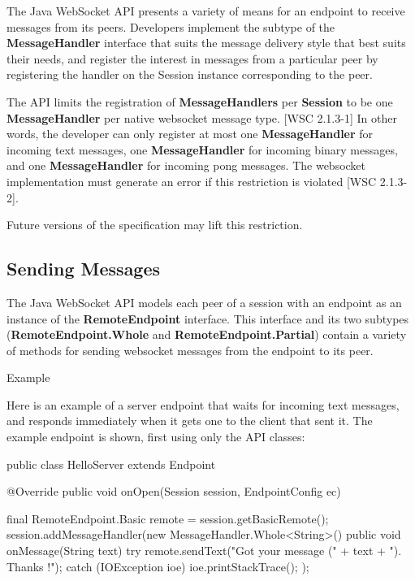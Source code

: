 The Java WebSocket API presents a variety of means for an endpoint to receive messages from its peers. Developers implement the subtype of the \textbf{MessageHandler} interface that suits the message delivery style that best suits their needs, and register the interest in messages from a particular peer by registering the handler on the Session instance corresponding to the peer.

The API limits the registration of \textbf{MessageHandlers} per \textbf{Session} to be one \textbf{MessageHandler} per native websocket message type. [WSC 2.1.3-1] In other words, the developer can only register at most one \textbf{MessageHandler} for incoming text messages, one \textbf{MessageHandler} for incoming binary messages, and one \textbf{MessageHandler} for incoming pong messages. The websocket implementation must generate an error if this restriction is violated [WSC 2.1.3-2].

Future versions of the specification may lift this restriction.

\subsection{Sending Messages}

The Java WebSocket API models each peer of a session with an endpoint as an instance of the \textbf{RemoteEndpoint} interface. This interface and its two subtypes (\textbf{RemoteEndpoint.Whole} and \textbf{RemoteEndpoint.Partial}) contain a variety of methods for sending websocket messages from the endpoint to its peer.

Example

Here is an example of a server endpoint that waits for incoming text messages, and responds immediately when it gets one to the client that sent it. The example endpoint is shown, first using only the API classes:

\begin{listing}{1}
public class HelloServer extends Endpoint {
    @Override
    public void onOpen(Session session, EndpointConfig ec) {
        final RemoteEndpoint.Basic remote = session.getBasicRemote();
        session.addMessageHandler(new MessageHandler.Whole<String>() {
            public void onMessage(String text) {
                try {
                    remote.sendText("Got your message (" + text + "). Thanks !");
                } catch (IOException ioe) {
                    ioe.printStackTrace();
                }
            }
        });

    }
}
\end{listing}

